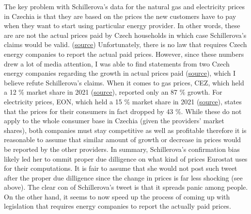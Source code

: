 \documentclass[fleqn,12pt]{article}
\begin{document}
The key problem with Schillerova's data for the natural gas and electricity prices in Czechia is that they are based on the prices the new customers have to pay when they 
want to start using particular energy provider. In other words, these are are not the actual prices paid by Czech households in which case Schillerova's claims would be valid. 
(\href{https://www.idnes.cz/ekonomika/domaci/cena-plyn-cesko-lonsky-rust-eurostat.A230426_124224_ekonomika_vebe}{source}) Unfortunately, there is no law that requires 
Czech energy companies to report the actual paid prices. However, since these numbers drew a lot of media attention, I was able to find statements from two Czech energy companies regarding the 
growth in actual prices paid (\href{https://www.idnes.cz/ekonomika/domaci/cena-plyn-cesko-lonsky-rust-eurostat.A230426_124224_ekonomika_vebe}{source}), which I believe refute Schillerova's claims. 
When it comes to gas prices, CEZ, which held a 12 \% market share in 2021 (\href{https://ekonomickydenik.cz/cez-a-innogy-posiluji-podil-na-proridlem-trhu-s-elektrinou-a-plynem/}{source}), reported only an 87 \% growth.
For electricity prices, EON, which held a 15 \% market share in 2021 (\href{https://ekonomickydenik.cz/cez-a-innogy-posiluji-podil-na-proridlem-trhu-s-elektrinou-a-plynem/}{source}), 
states that the prices for their consumers in fact dropped by 43 \%. While these do not apply to the whole 
consumer base in Czechia (given the providers' market shares), both companies must stay competitive as well as profitable therefore it is reasonable to assume that similar 
amount of growth or decrease in prices would be reported by the other providers. In summary, Schillerova's confirmation bias likely led her to ommit proper due dilligence on what 
kind of prices Eurostat uses for their computations. It is fair to assume that she would not post such tweet after the proper due dilligence since the change in prices is 
far less shocking (see above). The clear con of Schillerova's tweet is that it spreads panic among people. On the other hand, it seems to now speed up the process of coming up with 
legislation that requires energy companies to report the actually paid prices.



\newpage

\end{document}
